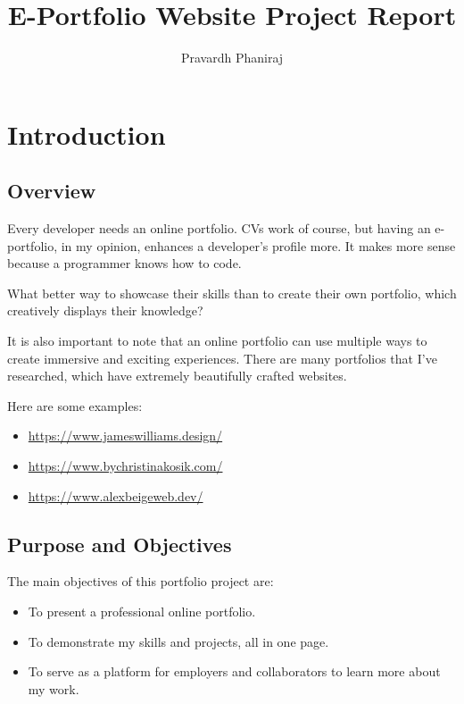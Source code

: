 \documentclass[15pt]{report}
\title{E-Portfolio Website Project Report}
\author{Pravardh Phaniraj}
\begin{document}
\maketitle

\tableofcontents

\chapter{Introduction}
\section{Overview}

Every developer needs an online portfolio. CVs work of course, but having an e-portfolio, in my opinion, enhances a developer's profile more. It makes more sense because a programmer knows how to code.

What better way to showcase their skills than to create their own portfolio, which creatively displays their knowledge?

It is also important to note that an online portfolio can use multiple ways to create immersive and exciting experiences. There are many portfolios that I've researched, which have extremely beautifully crafted websites.

Here are some examples:

\begin{itemize}

    \item \href{https://www.jameswilliams.design/}{https://www.jameswilliams.design/}
 
    \item \href{https://www.bychristinakosik.com/}{https://www.bychristinakosik.com/}
    
    \item \href{https://www.alexbeigeweb.dev/}{https://www.alexbeigeweb.dev/}

\end{itemize}

\section{Purpose and Objectives}

The main objectives of this portfolio project are:

\begin{itemize}

    \item To present a professional online portfolio.
    \item To demonstrate my skills and projects, all in one page.
    \item To serve as a platform for employers and collaborators to learn more about my work.

\end{itemize}
\end{document}
